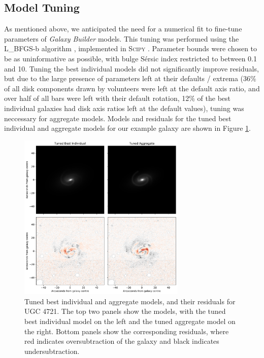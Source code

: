 \documentclass[../main.tex]{subfiles}
\begin{document}
\subsection{Model Tuning}

As mentioned above, we anticipated the need for a numerical fit to fine-tune parameters of \textit{Galaxy Builder} models. This tuning was performed using the L\_BFGS-b algorithm \citep{doi:10.1137/0916069}, implemented in \textsc{Scipy} \citep{scipy-paper}. Parameter bounds were chosen to be as uninformative as possible, with bulge Sérsic index restricted to between 0.1 and 10. Tuning the best individual models did not significantly improve residuals, but due to the large presence of parameters left at their defaults / extrema (36\% of all disk components drawn by volunteers were left at the default axis ratio, and over half of all bars were left with their default rotation, 12\% of the best individual galaxies had disk axis ratios left at the default values), tuning was neccessary for aggregate models. Models and residuals for the tuned best individual and aggregate models for our example galaxy are shown in Figure \ref{fig:bi_vs_agg_comparison}.

\begin{figure}
  \includegraphics[width=8cm]{images__method/bi_vs_agg_comparison.pdf}
  \caption{Tuned best individual and aggregate models, and their residuals for UGC 4721. The top two panels show the models, with the tuned best individual model on the left and the tuned aggregate model on the right. Bottom panels show the corresponding residuals, where red indicates oversubtraction of the galaxy and black indicates undersubtraction.}
  \label{fig:bi_vs_agg_comparison}
\end{figure}
\end{document}
